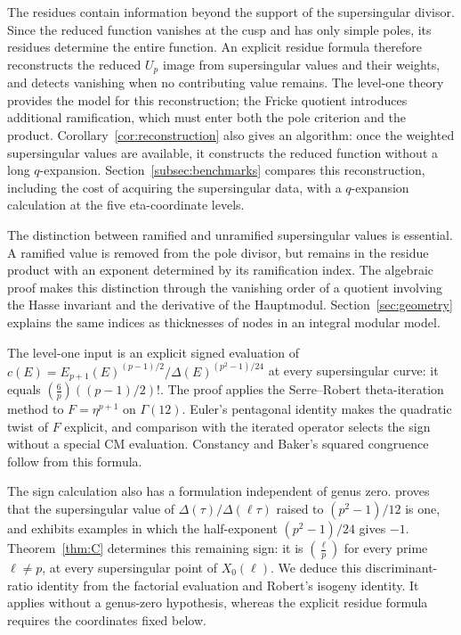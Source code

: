 \documentclass[11pt,a4paper]{article}
\numberwithin{equation}{section}
\theoremstyle{definition}
\theoremstyle{remark}
\begin{document}
The residues contain information beyond the support of the supersingular divisor.
Since the reduced function vanishes at the cusp and has only simple poles, its
residues determine the entire function. An explicit residue formula therefore
reconstructs the reduced $U_p$ image from supersingular values and their weights,
and detects vanishing when no contributing value remains. The level-one theory
provides the model for this reconstruction; the Fricke quotient introduces
additional ramification, which must enter both the pole criterion and the product.
Corollary~\ref{cor:reconstruction} also gives an algorithm: once the weighted
supersingular values are available, it constructs the reduced function without
a long $q$-expansion. Section~\ref{subsec:benchmarks} compares this reconstruction,
including the cost of acquiring the supersingular data, with a
$q$-expansion calculation at the five eta-coordinate levels.

The distinction between ramified and unramified supersingular values is essential.
A ramified value is removed from the pole divisor, but remains in the residue
product with an exponent determined by its ramification index. The algebraic proof
makes this distinction through the vanishing order of a quotient involving the Hasse
invariant and the derivative of the Hauptmodul. Section~\ref{sec:geometry} explains
the same indices as thicknesses of nodes in an integral modular model.

The level-one input is an explicit signed evaluation of
$c(E)=E_{p+1}(E)^{(p-1)/2}/\Delta(E)^{(p^2-1)/24}$ at every supersingular
curve: it equals $\left(\frac6p\right)((p-1)/2)!$. The proof applies the
Serre--Robert theta-iteration method to $F=\eta^{p+1}$ on $\Gamma(12)$.
Euler's pentagonal identity makes the quadratic twist of $F$ explicit,
and comparison with the iterated operator selects the sign without a
special CM evaluation. Constancy and Baker's squared congruence follow
from this formula.

The sign calculation also has a formulation independent of genus zero.
\citet[Theorem~1.2 and Remark~4]{Ono25} proves that the supersingular value of
$\Delta(\tau)/\Delta(\ell\tau)$ raised to $(p^2-1)/12$ is one, and exhibits
examples in which the half-exponent $(p^2-1)/24$ gives $-1$.
Theorem~\ref{thm:C} determines this remaining sign: it is
$\left(\frac{\ell}{p}\right)$ for every prime $\ell\ne p$, at every
supersingular point of $X_0(\ell)$. We deduce this discriminant-ratio
identity from the factorial evaluation and Robert's isogeny identity.
It applies without a genus-zero hypothesis, whereas the explicit residue
formula requires the coordinates fixed below.
\end{document}
